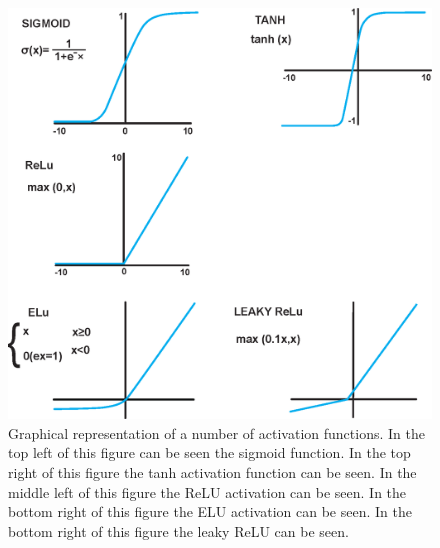             \begin{figure}
                \centering
                
                \includegraphics[width=0.7\linewidth]{figures/background_activation_functions.png}
                
                \captionsetup{singlelinecheck=false}
                \caption{
                    Graphical representation of a number of activation functions. In the top left of this figure can be seen the sigmoid function. In the top right of this figure the tanh activation function can be seen. In the middle left of this figure the \gls{ReLU} activation can be seen. In the bottom right of this figure the \gls{ELU} activation can be seen. In the bottom right of this figure the leaky \gls{ReLU} can be seen.
                }
                \label{fig:pseudo_bayesian_dip_denoising_as_a_preprocessing_step_for_kinetic_modelling_in_dynamic_pet_appendix_methods_network_design_and_execution_activation_functions}
            \end{figure}


